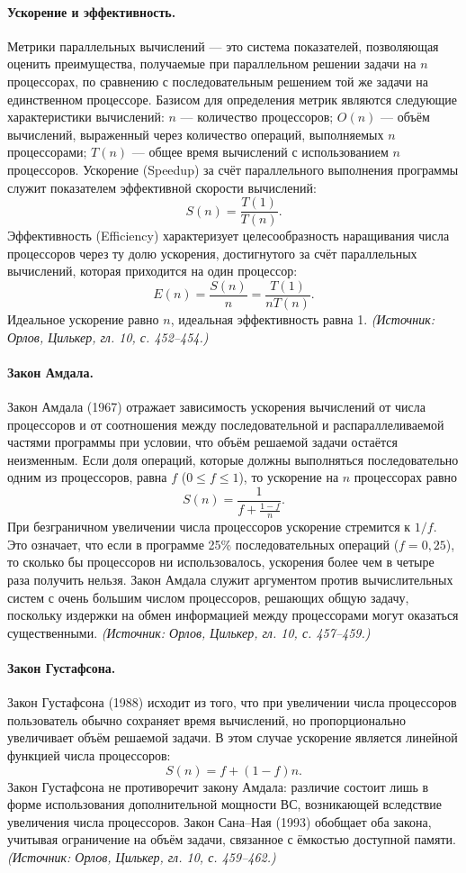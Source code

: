 \documentclass[a4paper,12pt]{article}
\begin{document}
\paragraph{Ускорение и эффективность.}
Метрики параллельных вычислений — это система показателей, позволяющая оценить преимущества, получаемые при параллельном решении задачи на \(n\) процессорах, по сравнению с последовательным решением той же задачи на единственном процессоре. Базисом для определения метрик являются следующие характеристики вычислений: \(n\) — количество процессоров; \(O(n)\) — объём вычислений, выраженный через количество операций, выполняемых \(n\) процессорами; \(T(n)\) — общее время вычислений с использованием \(n\) процессоров. Ускорение (Speedup) за счёт параллельного выполнения программы служит показателем эффективной скорости вычислений:
\[
S(n)=\frac{T(1)}{T(n)}.
\]
Эффективность (Efficiency) характеризует целесообразность наращивания числа процессоров через ту долю ускорения, достигнутого за счёт параллельных вычислений, которая приходится на один процессор:
\[
E(n)=\frac{S(n)}{n}=\frac{T(1)}{nT(n)}.
\]
Идеальное ускорение равно \(n\), идеальная эффективность равна 1.
\textit{(Источник: Орлов, Цилькер, гл. 10, с. 452--454.)}

\paragraph{Закон Амдала.}
Закон Амдала (1967) отражает зависимость ускорения вычислений от числа процессоров и от соотношения между последовательной и распараллеливаемой частями программы при условии, что объём решаемой задачи остаётся неизменным. Если доля операций, которые должны выполняться последовательно одним из процессоров, равна \(f\) (\(0\le f\le1\)), то ускорение на \(n\) процессорах равно
\[
S(n)=\frac{1}{f+\frac{1-f}{n}}.
\]
При безграничном увеличении числа процессоров ускорение стремится к \(1/f\). Это означает, что если в программе 25\% последовательных операций (\(f=0{,}25\)), то сколько бы процессоров ни использовалось, ускорения более чем в четыре раза получить нельзя. Закон Амдала служит аргументом против вычислительных систем с очень большим числом процессоров, решающих общую задачу, поскольку издержки на обмен информацией между процессорами могут оказаться существенными.
\textit{(Источник: Орлов, Цилькер, гл. 10, с. 457--459.)}

\paragraph{Закон Густафсона.}
Закон Густафсона (1988) исходит из того, что при увеличении числа процессоров пользователь обычно сохраняет время вычислений, но пропорционально увеличивает объём решаемой задачи. В этом случае ускорение является линейной функцией числа процессоров:
\[
S(n)=f+(1-f)n.
\]
Закон Густафсона не противоречит закону Амдала: различие состоит лишь в форме использования дополнительной мощности ВС, возникающей вследствие увеличения числа процессоров. Закон Сана–Ная (1993) обобщает оба закона, учитывая ограничение на объём задачи, связанное с ёмкостью доступной памяти.
\textit{(Источник: Орлов, Цилькер, гл. 10, с. 459--462.)}
\end{document}
